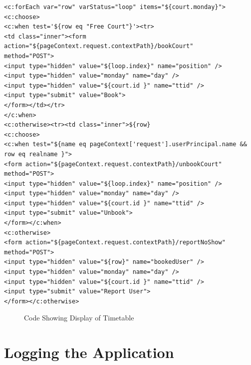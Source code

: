 \begin{lstlisting}
<c:forEach var="row" varStatus="loop" items="${court.monday}">
<c:choose>
<c:when test='${row eq "Free Court"}'><tr>
<td class="inner"><form action="${pageContext.request.contextPath}/bookCourt"
method="POST">
<input type="hidden" value="${loop.index}" name="position" />
<input type="hidden" value="monday" name="day" /> 
<input type="hidden" value="${court.id }" name="ttid" />
<input type="submit" value="Book">
</form></td></tr>
</c:when>
<c:otherwise><tr><td class="inner">${row}
<c:choose>
<c:when test="${name eq pageContext['request'].userPrincipal.name && row eq realname }">
<form action="${pageContext.request.contextPath}/unbookCourt" method="POST">
<input type="hidden" value="${loop.index}" name="position" />
<input type="hidden" value="monday" name="day" /> 
<input type="hidden" value="${court.id }" name="ttid" /> 
<input type="submit" value="Unbook">
</form></c:when>
<c:otherwise>
<form action="${pageContext.request.contextPath}/reportNoShow" method="POST">
<input type="hidden" value="${row}" name="bookedUser" />
<input type="hidden" value="monday" name="day" /> 
<input type="hidden" value="${court.id }" name="ttid" /> 
<input type="submit" value="Report User">
</form></c:otherwise>
\end{lstlisting}
\begin{figure}[H]
\caption{Code Showing Display of Timetable}
\end{figure}


\section{Logging the Application}

